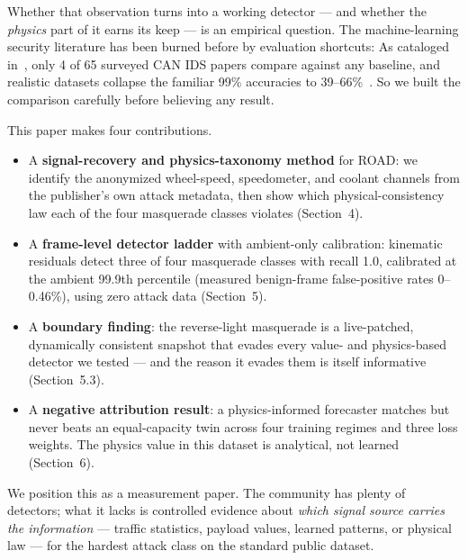 \documentclass[10pt,twocolumn]{article}
\begin{document}
Whether that observation turns into a working detector --- and whether the \emph{physics} part of it earns its keep --- is an empirical question. The machine-learning security literature has been burned before by evaluation shortcuts: As cataloged in~\cite{verma2024}, only 4 of 65 surveyed CAN IDS papers compare against any baseline, and realistic datasets collapse the familiar 99\% accuracies to 39--66\%~\cite{song2026}. So we built the comparison carefully before believing any result.

This paper makes four contributions.
\begin{itemize}
\item A \textbf{signal-recovery and physics-taxonomy method} for ROAD: we identify the anonymized wheel-speed, speedometer, and coolant channels from the publisher's own attack metadata, then show which physical-consistency law each of the four masquerade classes violates (Section~4).
\item A \textbf{frame-level detector ladder} with ambient-only calibration: kinematic residuals detect three of four masquerade classes with recall 1.0, calibrated at the ambient 99.9th percentile (measured benign-frame false-positive rates 0--0.46\%), using zero attack data (Section~5).
\item A \textbf{boundary finding}: the reverse-light masquerade is a live-patched, dynamically consistent snapshot that evades every value- and physics-based detector we tested --- and the reason it evades them is itself informative (Section~5.3).
\item A \textbf{negative attribution result}: a physics-informed forecaster matches but never beats an equal-capacity twin across four training regimes and three loss weights. The physics value in this dataset is analytical, not learned (Section~6).
\end{itemize}

We position this as a measurement paper. The community has plenty of detectors; what it lacks is controlled evidence about \emph{which signal source carries the information} --- traffic statistics, payload values, learned patterns, or physical law --- for the hardest attack class on the standard public dataset.
\end{document}
